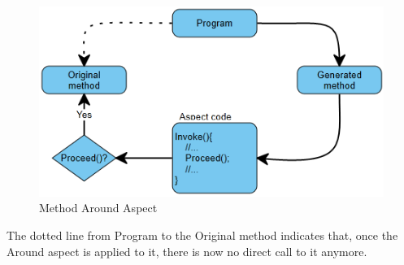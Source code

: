 \begin{figure}[H]
  \includegraphics[scale=1.0]{AroundOverview.PNG}
  \centering
  \caption{Method Around Aspect\label{around_overview}}
\end{figure}

The dotted line from Program to the Original method indicates that, once the Around aspect is applied to it, there is now no direct call to it anymore.
